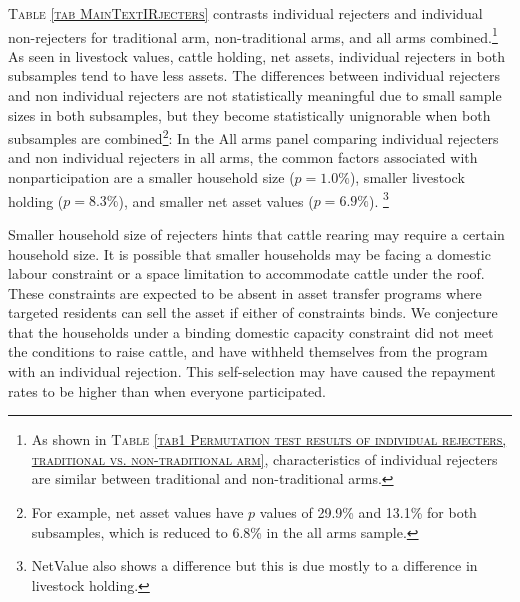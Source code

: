 	\textsc{\normalsize Table \ref{tab MainTextIRjecters}} contrasts individual rejecters and individual non-rejecters for \textsf{traditional} arm, non-\textsf{traditional} arms, and all arms combined.\footnote{As shown in \textsc{Table \ref{tab1 Permutation test results of individual rejecters, traditional vs. non-traditional arm}}, characteristics of individual rejecters are similar between \textsf{traditional} and non-\textsf{traditional} arms. } As seen in \textsf{livestock values, cattle holding, net assets}, individual rejecters in both subsamples tend to have less assets. The differences between individual rejecters and non individual rejecters are not statistically meaningful due to small sample sizes in both subsamples, but they become statistically unignorable when both subsamples are combined\footnote{For example, net asset values have $p$ values of 29.9\% and 13.1\% for both subsamples, which is reduced to 6.8\% in the all arms sample. }: In the \textsf{All arms} panel comparing individual rejecters and non individual rejecters in all arms, the common factors associated with nonparticipation are a smaller household size ($p=1.0\%$), smaller livestock holding ($p=8.3\%$), and smaller net asset values ($p=6.9\%$).%
	\footnote{\textsf{NetValue} also shows a difference but this is due mostly to a difference in livestock holding. } 
		

	Smaller household size of rejecters hints that cattle rearing may require a certain household size. %
	It is possible that smaller households may be facing a domestic labour constraint or a space limitation to accommodate cattle under the roof. These constraints are expected to be absent in asset transfer programs where targeted residents can sell the asset if either of constraints binds. We conjecture that the households under a binding domestic capacity constraint did not meet the conditions to raise cattle, and have withheld themselves from the program with an individual rejection. This self-selection may have caused the repayment rates to be higher than when everyone participated. 

